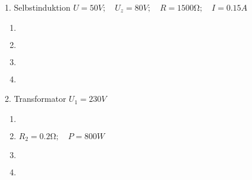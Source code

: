 \documentclass{alex_hü}
\begin{document}
\renewcommand{\labelenumi}{(\alph{enumi})}


\begin{mybox}{1. Selbstinduktion}
	\centering \( U = 50 \unit{V};\quad U_z = 80 \unit{V};\quad R = 1500 \unit{\ohm};\quad I = 0.15 \unit{A} \)
	\tcblower
	\begin{enumerate}
		\item \(  \)
	\tcbline
		\item \(  \)
%			
	\tcbline
		\item \(  \)
		\begin{flalign*}
		\end{flalign*}
	\tcbline
		\item 
%			
	\end{enumerate}
\end{mybox}

\begin{mybox}{2. Transformator}
	\centering \( U_1 = 230 \unit{V} \)
	\tcblower
	\begin{enumerate}
		\item \(  \)
	\tcbline
		\item \( R_2 = 0.2 \unit{\ohm};\quad P = 800 \unit{W} \)
	\tcbline
		\item \(  \)
		\begin{flalign*}
		\end{flalign*}
	\tcbline
		\item 
%			
	\end{enumerate}
\end{mybox}
\end{document}
